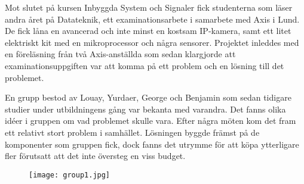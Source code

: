 



\begin{abstracts}        %

Mot slutet på kursen Inbyggda System och Signaler fick studenterna som läser andra året på Datateknik, ett examinationsarbete i samarbete med Axis i Lund. De fick låna en avancerad och inte minst en kostsam IP-kamera, samt ett litet elektriskt kit med en mikroprocessor och några sensorer. Projektet inleddes med en föreläsning från två Axis-anställda som sedan klargjorde att examinationsuppgiften var att komma på ett problem och en lösning till det problemet. 

En grupp bestod av Louay, Yurdaer, George och Benjamin som sedan tidigare studier under utbildningens gång var bekanta med varandra. Det fanns olika idéer i gruppen om vad problemet skulle vara. Efter några möten kom det fram ett relativt stort problem i samhället. Lösningen byggde främst på de komponenter som gruppen fick, dock fanns det utrymme för att köpa ytterligare fler förutsatt att det inte översteg en viss budget.



\begin{figure}[h]
  \texttt{[image: group1.jpg]}
  
  \label{fig:group1}
\end{figure}


\end{abstracts}



